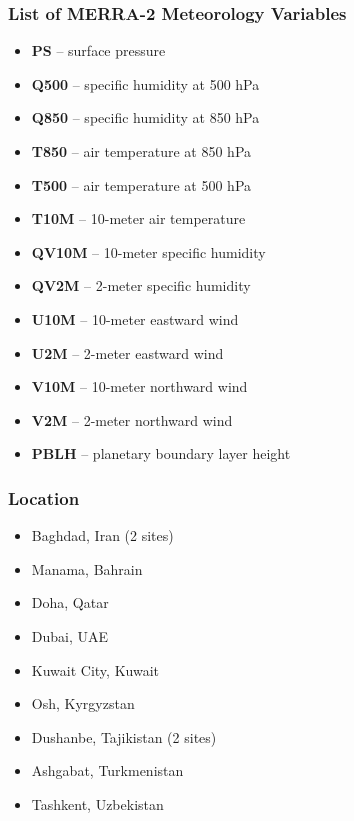 \documentclass[draft]{agujournal2019}
\begin{document}
    \subsubsection{List of MERRA-2 Meteorology Variables}
    \begin{itemize}
        \item \textbf{PS} -- surface pressure
        \item \textbf{Q500} -- specific humidity at 500 hPa
        \item \textbf{Q850} -- specific humidity at 850 hPa
        \item \textbf{T850} -- air temperature at 850 hPa
        \item \textbf{T500} -- air temperature at 500 hPa
        \item \textbf{T10M} -- 10-meter air temperature
        \item \textbf{QV10M} -- 10-meter specific humidity
        \item \textbf{QV2M} -- 2-meter specific humidity
        \item \textbf{U10M} -- 10-meter eastward wind
        \item \textbf{U2M} -- 2-meter eastward wind
        \item \textbf{V10M} -- 10-meter northward wind
        \item \textbf{V2M} -- 2-meter northward wind
        \item \textbf{PBLH} -- planetary boundary layer height
    \end{itemize}

    \subsubsection{Location}
    \begin{itemize}
        \item Baghdad, Iran (2 sites)
        \item Manama, Bahrain
        \item Doha, Qatar
        \item Dubai, UAE
        \item Kuwait City, Kuwait
        \item Osh, Kyrgyzstan
        \item Dushanbe, Tajikistan (2 sites)
        \item Ashgabat, Turkmenistan
        \item Tashkent, Uzbekistan
    \end{itemize}
\end{document}
